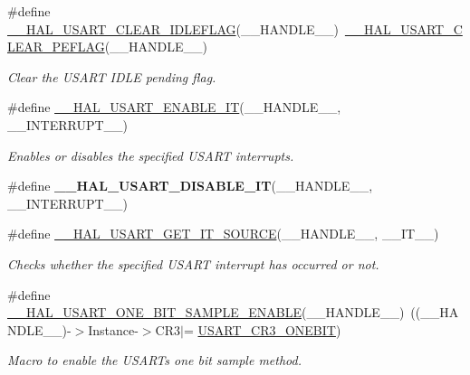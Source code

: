 \begin{DoxyCompactItemize}
\#define \hyperlink{group___u_s_a_r_t___exported___macros_ga9805694ed8725e6b1f52c5f16cf7bbef}{\+\_\+\+\_\+\+H\+A\+L\+\_\+\+U\+S\+A\+R\+T\+\_\+\+C\+L\+E\+A\+R\+\_\+\+I\+D\+L\+E\+F\+L\+AG}(\+\_\+\+\_\+\+H\+A\+N\+D\+L\+E\+\_\+\+\_\+)~\hyperlink{group___u_s_a_r_t___exported___macros_ga8d03cf61b8ec17b505cb4eac48333632}{\+\_\+\+\_\+\+H\+A\+L\+\_\+\+U\+S\+A\+R\+T\+\_\+\+C\+L\+E\+A\+R\+\_\+\+P\+E\+F\+L\+AG}(\+\_\+\+\_\+\+H\+A\+N\+D\+L\+E\+\_\+\+\_\+)
\begin{DoxyCompactList}\small\item\em Clear the U\+S\+A\+RT I\+D\+LE pending flag. \end{DoxyCompactList}\item 
\#define \hyperlink{group___u_s_a_r_t___exported___macros_ga2258521c741456b4254064958ca7ef51}{\+\_\+\+\_\+\+H\+A\+L\+\_\+\+U\+S\+A\+R\+T\+\_\+\+E\+N\+A\+B\+L\+E\+\_\+\+IT}(\+\_\+\+\_\+\+H\+A\+N\+D\+L\+E\+\_\+\+\_\+,  \+\_\+\+\_\+\+I\+N\+T\+E\+R\+R\+U\+P\+T\+\_\+\+\_\+)
\begin{DoxyCompactList}\small\item\em Enables or disables the specified U\+S\+A\+RT interrupts. \end{DoxyCompactList}\item 
\#define {\bfseries \+\_\+\+\_\+\+H\+A\+L\+\_\+\+U\+S\+A\+R\+T\+\_\+\+D\+I\+S\+A\+B\+L\+E\+\_\+\+IT}(\+\_\+\+\_\+\+H\+A\+N\+D\+L\+E\+\_\+\+\_\+,  \+\_\+\+\_\+\+I\+N\+T\+E\+R\+R\+U\+P\+T\+\_\+\+\_\+)
\item 
\#define \hyperlink{group___u_s_a_r_t___exported___macros_ga3ab781c75a319bd41e4b64098259f018}{\+\_\+\+\_\+\+H\+A\+L\+\_\+\+U\+S\+A\+R\+T\+\_\+\+G\+E\+T\+\_\+\+I\+T\+\_\+\+S\+O\+U\+R\+CE}(\+\_\+\+\_\+\+H\+A\+N\+D\+L\+E\+\_\+\+\_\+,  \+\_\+\+\_\+\+I\+T\+\_\+\+\_\+)
\begin{DoxyCompactList}\small\item\em Checks whether the specified U\+S\+A\+RT interrupt has occurred or not. \end{DoxyCompactList}\item 
\#define \hyperlink{group___u_s_a_r_t___exported___macros_gab18a3100efa1cf12b5874cadec193e04}{\+\_\+\+\_\+\+H\+A\+L\+\_\+\+U\+S\+A\+R\+T\+\_\+\+O\+N\+E\+\_\+\+B\+I\+T\+\_\+\+S\+A\+M\+P\+L\+E\+\_\+\+E\+N\+A\+B\+LE}(\+\_\+\+\_\+\+H\+A\+N\+D\+L\+E\+\_\+\+\_\+)~((\+\_\+\+\_\+\+H\+A\+N\+D\+L\+E\+\_\+\+\_\+)-\/$>$Instance-\/$>$C\+R3$\vert$= \hyperlink{group___peripheral___registers___bits___definition_ga9a96fb1a7beab602cbc8cb0393593826}{U\+S\+A\+R\+T\+\_\+\+C\+R3\+\_\+\+O\+N\+E\+B\+IT})
\begin{DoxyCompactList}\small\item\em Macro to enable the U\+S\+A\+RT\textquotesingle{}s one bit sample method. \end{DoxyCompactList}\item 

\end{DoxyCompactItemize}
